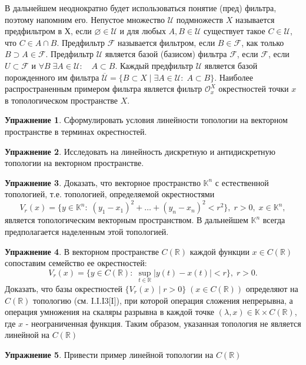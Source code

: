 \documentclass[a4paper, 12pt]{article}
\theoremstyle{definition}
\newtheorem{problem}{Упражнение}[section]
\theoremstyle{remark}
\begin{document}
В дальнейшем неоднократно будет использоваться понятие (пред) фильтра, поэтому напомним его.
Непустое множество $\mathcal{U} $ подмножеств $X$ называется предфильтром в Х, если $\varnothing\in \mathcal{U} $
и для любых $A, B \in \mathcal{U} $ существует такое $C\in \mathcal{U} $, что $C\in A\cap B$.
Предфильтр $\mathcal{F}$ называется фильтром, если $B\in \mathcal{F}$, как только $B \supset A \in \mathcal{F}$.
Предфильтр $\mathcal{U}$ является базой (базисом) фильтра $\mathcal{F}$, если $\mathcal{F}$,
если $U\subset \mathcal{F}$ и $\forall B\; \exists A\in \mathcal{U}: \quad A\subset B$. Каждый предфильтр
$\mathcal{U}$ является базой порожденного им фильтра $\overline{\mathcal{U}} = \{B\subset X \;|\; \exists A \in \mathcal{U}: \; A\subset B\}$.
Наиболее распространенным примером фильтра является фильтр $\mathcal{O}^X _x$ окрестностей
точки $x$ в топологическом пространстве $X$.
\begin{problem}
    Сформулировать условия линейности топологии на векторном пространстве в терминах окрестностей.
\end{problem}
\begin{problem}
    Исследовать на линейность дискретную и антидискретную топологии на векторном пространстве.
\end{problem}
\begin{problem}
    Доказать, что векторное пространство $\mathbb{K}^n$ с естественной топологией, т.е. топологией,
    определяемой окрестностями 
    \[V_r(x) = \{y\in \mathbb{K}^n:\; (y_1-x_1)^2 + \dots + (y_n -x_n)^2 < r^2\}, \; r >0, \; x\in \mathbb{K}^n,\]
    является топологическим векторным пространством. В дальнейшем $\mathbb{K}^n$ всегда
    предполагается наделенным этой топологией.
\end{problem}
\begin{problem}
    В векторном пространстве $C(\mathbb{R})$ каждой функции $x\in C(\mathbb{R})$ сопоставим семейство
    ее окрестностей:
    \[V_r(x) = \{y\in C(\mathbb{R}):\; \sup_{t\in\mathbb{R}}|y(t)-x(t)|<r \}, \; r >0.\]
    Доказать, что базы окрестностей $\{V_r(x)\;|\;r>0\}\; (x\in C(\mathbb{R}))$ определяют на $C(\mathbb{R})$
    топологию (см. I.I.I3[I]), при которой операция сложения непрерывна, а операция умножения на скаляры
    разрывна в каждой точке $(\lambda, x)\in \mathbb{K}\times C(\mathbb{R})$, где $x$ - неограниченная функция.
    Таким образом, указанная топология не является линейной на $C(\mathbb{R})$
\end{problem}
\begin{problem}
    Привести пример линейной топологии на $C(\mathbb{R})$
\end{problem}
\end{document}
